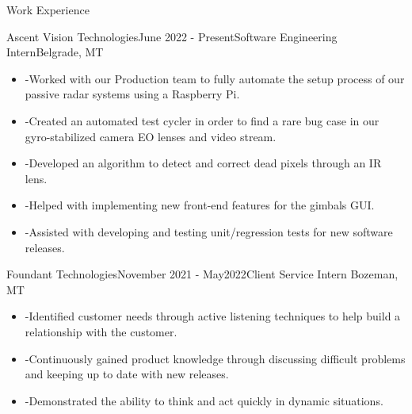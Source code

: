 \documentclass{resume} %
\begin{document}
\begin{rSection}{Work Experience}

\begin{rSubsection}{Ascent Vision Technologies}{June 2022 - Present}{Software Engineering Intern}{Belgrade, MT}
\begin{itemize}[leftmargin=*, label={}]
\setlength\itemsep{-1.7em}
\item -Worked with our Production team to fully automate the setup process of our passive radar systems using a Raspberry Pi. \\
\item -Created an automated test cycler in order to find a rare bug case in our gyro-stabilized camera EO lenses and video stream. \\
\item -Developed an algorithm to detect and correct dead pixels through an IR lens.\\
\item -Helped with implementing new front-end features for the gimbals GUI.  \\
\item -Assisted with developing and testing unit/regression tests for new software releases. 
\end{itemize}
\end{rSubsection}

\begin{rSubsection}{Foundant Technologies}{November 2021 - May2022}{Client Service Intern}
{Bozeman, MT}
\begin{itemize}[leftmargin=*, label={}]
\setlength\itemsep{-1.7em}
\item -Identified customer needs through active listening techniques to help build a relationship with the customer. \\
\item -Continuously gained product knowledge through discussing difficult problems and keeping up to date with new releases. \\
\item -Demonstrated the ability to think and act quickly in dynamic situations.
\end{itemize}
\end{rSubsection}
\end{rSection}
\end{document}
